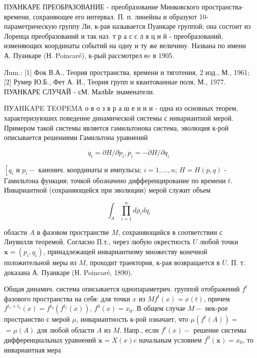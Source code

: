 \documentclass[10pt]{article}
\begin{document}
ПУАНКАРЕ ПРЕОБРАЗОВАНИЕ - преобразование Минковского пространства-времени, сохраняющее его интервал. П. п. линейны и образуют 10-параметрическую группу Ли, к-рая называется Пуанкаре группой; она состоит из Лоренца преобразований и так наз. т р а с с л я ц и й - преобразований, изменяющих координаты событий на одну и ту же величину. Названа по имени А. Пуанкаре (Н. Poincaré), к-рый рассмотрел еe в 1905.



Лum.: [1] Фок В.А., Теория пространства, времени и тяготения, 2 изд., М., 1961; [2] Румер Ю.Б., Фет А. И., Теория групп и квантованные поля, М., 1977. ПУАНКАРЕ СЛУЧАЙ - сМ. МалЫе знаменатели.



ПУAHKAPE TEOPEMA о в о з в р а ш е н и и - одна из основных теорем, характеризуюших поведение динамической системы с инвариантной мерой. Примером такой системы является гамильтонова система, эволюция к-рой описывается решениями Гамильтона уравнений



\[

\dot{q}_{i}=\partial H / \partial p_{i}, \dot{p}_{i}=-\partial H / \partial q_{i}

\]



$\left[q_{i}\right.$ и $p_{i}-$ канонич. координаты и импульсы; $i=1, \ldots, n$; $H=H(p, q)$ - Гамильтона функция; точкой обозначено дифференцирование по времени $t$. Инвариантной (сохраняющейся при эволюции) мерой служит объем



\[

\int_{A} \prod_{i=1}^{n} d p_{i} d q_{i}

\]



области $A$ в фазовом пространстве $M$, сохраняющийся в соответствии с Лиувилля теоремой. Согласно П.т., через любую окрестность $U$ любой точки $\boldsymbol{x}=\left(p_{i}, q_{i}\right)$, принадлежащей инвариантному множеству конечной положительной меры из $M$, проходит траектория, к-рая возвращается в $U$. П. т. доказана А. Пуанкаре (Н. Poincaré, 1890).



Общая динамич. система описывается однопараметрич. группой отображений $f^{t}$ фазового пространства на себя: для точки $x$ из $M f^{t}(x)=x(t)$, причем $f^{t_{1}+t_{2}}(x)=f^{t_{2}}\left(f^{t_{1}}(x)\right)$, $f^{0}(x)=x_{0}$. В общем случае $M-$ нек-рое пространство с мерой $\mu$, инвариантность к-рой означает, что $\mu\left(f^{t}(A)\right)=$ $=\mu(A)$ для любой области $A$ из $M$. Напр., если $f^{t}(x)-$ решение системы дифференциальных уравнений $\dot{\boldsymbol{x}}=X(x) \mathrm{c}$ начальным условием $f^{0}(\boldsymbol{x})=x_{0}$, то инвариантная мера
\end{document}
